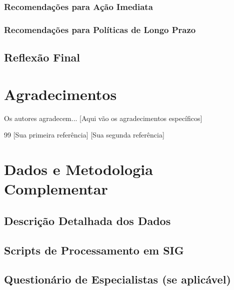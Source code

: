 \documentclass[12pt, a4paper]{article}
\begin{document}
\subsubsection{Recomendações para Ação Imediata}
\subsubsection{Recomendações para Políticas de Longo Prazo}

\subsection{Reflexão Final}

\section*{Agradecimentos}
Os autores agradecem... [Aqui vão os agradecimentos específicos]

\begin{thebibliography}{99}
\bibitem{} [Sua primeira referência]
\bibitem{} [Sua segunda referência]
\end{thebibliography}

\appendix
\section{Dados e Metodologia Complementar}
\subsection{Descrição Detalhada dos Dados}
\subsection{Scripts de Processamento em SIG}
\subsection{Questionário de Especialistas (se aplicável)}
\end{document}
